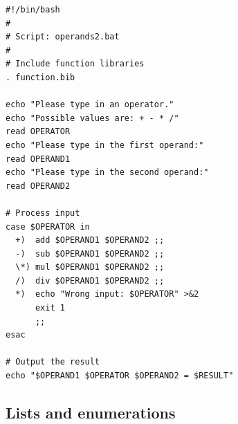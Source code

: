\documentclass{llncs}
\begin{document}
\lstset{
language=Bash,
captionpos=b, 
caption=This is the signature of the source code, 
label=QuellcodeBeispielNr1,
basicstyle=\ttfamily\footnotesize,      %
keywordstyle=\color{FrankfurtBlue},     %
commentstyle=\color{gray},              %
numbers=left,                           %
numberstyle=\footnotesize,              %
stepnumber=1,                           %
numbersep=5pt,                          %
backgroundcolor=\color{lightlightgray}, %
frame=none,                             %
tabsize=2,                              %
captionpos=b,                           %
breaklines=true,                        %
breakatwhitespace=false,                %
showspaces=false,                       %
showstringspaces=false                  %
showtabs=false,                         %
columns=fixed,                          %
morekeywords={},                        %
literate=%
{Ö}{{\"O}}1
{Ä}{{\"A}}1
{Ü}{{\"U}}1
{ö}{{\"o}}1
{ä}{{\"a}}1
{ü}{{\"u}}1
{ß}{{\ss}}1
{~}{{\textasciitilde}}1
}
\begin{lstlisting}
#!/bin/bash
#
# Script: operands2.bat
#
# Include function libraries
. function.bib

echo "Please type in an operator."
echo "Possible values are: + - * /"
read OPERATOR
echo "Please type in the first operand:"
read OPERAND1
echo "Please type in the second operand:"
read OPERAND2

# Process input 
case $OPERATOR in
  +)  add $OPERAND1 $OPERAND2 ;;
  -)  sub $OPERAND1 $OPERAND2 ;;
  \*) mul $OPERAND1 $OPERAND2 ;;
  /)  div $OPERAND1 $OPERAND2 ;;
  *)  echo "Wrong input: $OPERATOR" >&2
      exit 1
      ;;
esac

# Output the result
echo "$OPERAND1 $OPERATOR $OPERAND2 = $RESULT"
\end{lstlisting}

\subsection{Lists and enumerations}
\end{document}
